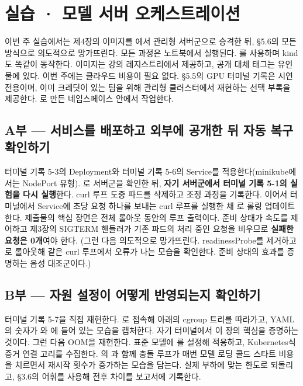 \section{실습 · 모델 서버 오케스트레이션}

이번 주 실습에서는 제4장의 이미지를 에서 관리형 서버군으로 승격한 뒤, §5.6의 모든 방식으로 의도적으로 망가뜨린다. 모든 과정은 노트북에서 실행된다. 를 사용하며 kind도 똑같이 동작한다. 이미지는 강의 레지스트리에서 제공하고, 공개 대체 태그는 유인물에 있다. 이번 주에는 클라우드 비용이 필요 없다. §5.5의 GPU 터미널 기록은 시연 전용이며, 이미 크레딧이 있는 팀을 위해 관리형 클러스터에서 재현하는 선택 부록을 제공한다. 로 만든 네임스페이스 안에서 작업한다.

\subsection*{A부 — 서비스를 배포하고 외부에 공개한 뒤 자동 복구 확인하기}

터미널 기록 5-3의 Deployment와 터미널 기록 5-6의 Service를 적용한다(minikube에서는 NodePort 유형). 로 서버군을 확인한 뒤, \textbf{자기 서버군에서 터미널 기록 5-1의 실험을 다시 실행}한다. curl 루프 도중 파드를 삭제하고 조정 과정을 기록한다. 이어서 터미널에서 Service에 초당 요청 하나를 보내는 curl 루프를 실행한 채 로 롤링 업데이트한다. 제출물의 핵심 장면은 전체 롤아웃 동안의 루프 출력이다. 준비 상태가 속도를 제어하고 제3장의 SIGTERM 핸들러가 기존 파드의 처리 중인 요청을 비우므로 \textbf{실패한 요청은 0개}여야 한다. (그런 다음 의도적으로 망가뜨린다. readinessProbe를 제거하고 로 롤아웃해 같은 curl 루프에서 오류가 나는 모습을 확인한다. 준비 상태의 효과를 증명하는 음성 대조군이다.)

\subsection*{B부 — 자원 설정이 어떻게 반영되는지 확인하기}

터미널 기록 5-7을 직접 재현한다. 로 접속해  아래의 cgroup 트리를 따라가고, YAML의 숫자가 와 에 들어 있는 모습을 캡처한다. 자기 터미널에서 이 장의 핵심을 증명하는 것이다. 그런 다음 OOM을 재현한다. 표준 모델에 를 설정해 적용하고, Kubernetes식 증거 연결 고리를 수집한다. 의 과 함께 충돌 루프가 매번 모델 로딩 콜드 스타트 비용을 치르면서 재시작 횟수가 증가하는 모습을 담는다. 실제 부하에 맞는 한도로 되돌리고, §3.6의 어휘를 사용해 전후 차이를 보고서에 기록한다.

